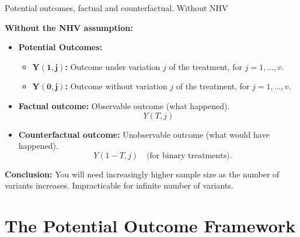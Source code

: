 \documentclass[aspectratio=169]{beamer}
\begin{document}
\begin{frame}{Potential outcomes, factual and counterfactual. Without NHV}
\vspace{-0.4cm}

\begin{center}
    \textbf{Without the NHV assumption:}
\end{center}

\begin{itemize}
    \item \textbf{Potential Outcomes:}
    \begin{itemize}
        \item[$\bullet$] $\pmb{Y(1, j)}$\textbf{:} Outcome under variation $j$ of the treatment, for $j = 1,\dots,v$.
        \vspace{0.1cm}
        
        \item[$\bullet$] $\pmb{Y(0, j)}$\textbf{:} Outcome without variation $j$ of the treatment, for $j = 1,\dots, v$.
    \end{itemize}

    \item \textbf{Factual outcome:} Observable outcome (what happened). 
    $$Y(T, j)$$
    
    \item \textbf{Counterfactual outcome:} Unobservable outcome (what would have happened). 
    $$\quad Y(1-T, j)\quad \text{(for binary treatments)}.$$
\end{itemize}

\textbf{Conclusion:} You will need increasingly higher sample size as the number of variants increases. Impracticable for infinite number of variants.

\end{frame}


    
    
    

\section{\Large{The Potential Outcome Framework}}
\end{document}
